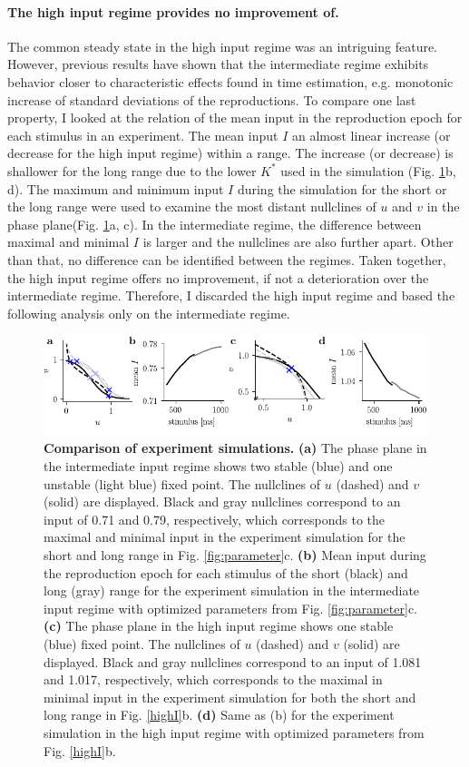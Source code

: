 \documentclass[10pt]{article}
\begin{document}
\paragraph{The high input regime provides no improvement of.}
The common steady state in the high input regime was an intriguing feature.
However, previous results have shown that the intermediate regime exhibits behavior closer to characteristic effects found in time estimation, e.g. monotonic increase of standard deviations of the reproductions. 
To compare one last property, I looked at the relation of the mean input in the reproduction epoch for each stimulus in an experiment.
The mean input $I$ an almost linear increase (or decrease for the high input regime) within a range. The increase (or decrease) is shallower for the long range due to the lower $K^*$ used in the simulation (Fig. \ref{fig:comparison}b, d).
The maximum and minimum input $I$ during the simulation for the short or the long range were used to examine the most distant nullclines of $u$ and $v$ in the phase plane(Fig. \ref{fig:comparison}a, c). 
In the intermediate regime, the difference between maximal and minimal $I$ is larger and the nullclines are also further apart. Other than that, no difference can be identified between the regimes. 
Taken together, the high input regime offers no improvement, if not a deterioration over the intermediate regime. Therefore, I discarded the high input regime and based the following analysis only on the intermediate regime. 

\begin{figure}[!htb]
	\centering
	\includegraphics{figures/supp_comparison.pdf}
	\caption{\textbf{Comparison of experiment simulations.}
	\textbf{(a)} The phase plane in the intermediate input regime shows two stable (blue) and one unstable (light blue) fixed point. The nullclines of $u$ (dashed) and $v$ (solid) are displayed. Black and gray nullclines correspond to an input of 0.71 and 0.79, respectively, which corresponds to the maximal and minimal input in the experiment simulation for the short and long range in Fig. \ref{fig:parameter}c.
	\textbf{(b)} Mean input during the reproduction epoch for each stimulus of the short (black) and long (gray) range for the experiment simulation in the intermediate input regime with optimized parameters from Fig. \ref{fig:parameter}c.
	\textbf{(c)} The phase plane in the high input regime shows one stable (blue) fixed point. The nullclines of $u$ (dashed) and $v$ (solid) are displayed. Black and gray nullclines correspond to an input of 1.081 and 1.017, respectively, which corresponds to the maximal in minimal input in the experiment simulation for both the short and long range in Fig. \ref{highI}b.
	\textbf{(d)} Same as (b) for the experiment simulation in the high input regime with optimized parameters from Fig. \ref{highI}b.
	}
\label{fig:comparison}
\end{figure}
\end{document}
